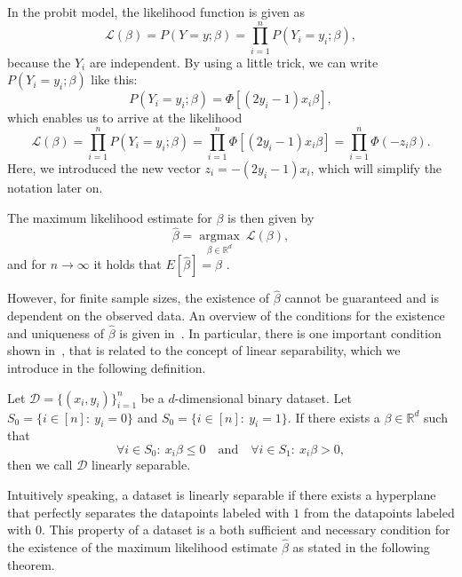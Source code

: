 In the probit model, the likelihood function is given as
\begin{equation}
    \label{eq:likelihood}
    \mathcal{L}(\beta) = P(Y=y ; \beta) = \prod_{i=1}^n P(Y_i=y_i ; \beta),
\end{equation}
because the $Y_i$ are independent. By using a little trick, we can
write $P(Y_i=y_i;\beta)$ like this:
\begin{equation*}
    P(Y_i = y_i ; \beta) = \Phi[(2y_i - 1) x_i \beta],
\end{equation*}
which enables us to arrive at the likelihood
\begin{equation}
    \mathcal{L}(\beta) = \prod_{i=1}^n P(Y_i=y_i ; \beta)
    = \prod_{i=1}^n \Phi[(2y_i - 1) x_i \beta]
    = \prod_{i=1}^n \Phi(- z_i \beta).
\end{equation}
Here, we introduced the new vector $z_i = - (2y_i - 1) x_i$, which will
simplify the notation later on.

The maximum likelihood estimate for $\beta$ is then given by
\begin{equation}
    \label{eq:maximum-likelihood-estimate}
    \hat{\beta} = \underset{\beta \in \mathbb{R}^d}{\operatorname{argmax}}\
    \mathcal{L}(\beta),
\end{equation}
and for $n \rightarrow \infty$ it holds that
$E[\hat{\beta}] = \beta$ \cite{regression-fahrmeir}.

However, for finite sample sizes, the existence of $\hat{\beta}$
cannot be guaranteed and is dependent on the observed data.
An overview of the conditions for the existence and uniqueness of
$\hat{\beta}$ is given in~\cite{probit-computational}.
In particular, there is one important condition shown
in~\cite{probit-existence}, that is related to the concept of
linear separability, which we introduce in the following definition.
\begin{definition}
    \label{def:linear-separability}
    Let $\mathcal{D}=\{(x_i, y_i)\}_{i=1}^n$ be a $d$-dimensional
    binary dataset.
    Let $S_0 = \{i \in [n]:\ y_i = 0\}$ and $S_0 = \{i \in [n]:\ y_i = 1\}$.
    If there exists a $\beta \in \mathbb{R}^d$ such that
    \begin{equation*}
        \forall i \in S_0:\ x_i \beta \leq 0\quad \text{and}\quad \forall i \in S_1:\ x_i \beta > 0,
    \end{equation*}
    then we call $\mathcal{D}$ linearly separable.
\end{definition}

\noindent Intuitively speaking, a dataset is linearly separable if there
exists a hyperplane that perfectly separates the datapoints labeled
with $1$ from the datapoints labeled with $0$.
This property of a dataset is a both sufficient and
necessary condition for the existence of the
maximum likelihood estimate $\hat{\beta}$ as stated in the following
theorem.

